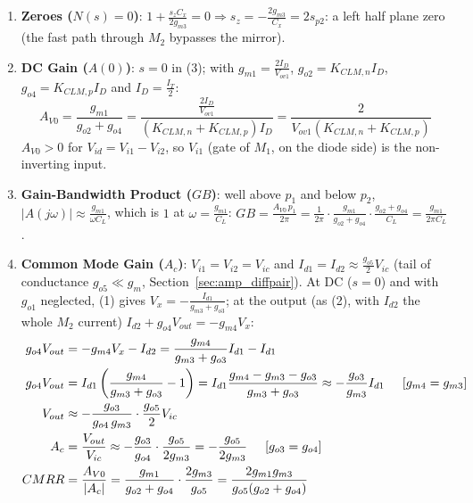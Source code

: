 \begin{enumerate}
  \item \textbf{Zeroes (\(N(s) = 0\))}:
    \(1 + \frac{s_z C_x}{2 g_{m3}} = 0 \Rightarrow s_z = -\frac{2 g_{m3}}{C_x} = 2 s_{p2}\): a left half plane zero (the
    fast path through \(M_2\) bypasses the mirror).
  \item \textbf{DC Gain (\(A(0)\))}: \(s = 0\) in (3); with \(g_{m1} = \frac{2 I_D}{V_{ov1}}\),
    \(g_{o2} = K_{CLM,n} I_D\), \(g_{o4} = K_{CLM,p} I_D\) and \(I_D = \frac{I_T}{2}\):
    \[
      A_{V0} = \frac{g_{m1}}{g_{o2} + g_{o4}} = \frac{\frac{2 I_D}{V_{ov1}}}{(K_{CLM,n} + K_{CLM,p}) I_D} = \frac{2}{V_{ov1}(K_{CLM,n} + K_{CLM,p})}
    \]
    \(A_{V0} > 0\) for \(V_{id} = V_{i1} - V_{i2}\), so \(V_{i1}\) (gate of
    \(M_1\), on the diode side) is the non-inverting input.
  \item \textbf{Gain-Bandwidth Product (\(GB\))}: well above \(p_1\) and below \(p_2\),
    \(|A(j\omega)| \approx \frac{g_{m1}}{\omega C_L}\), which is \(1\) at
    \(\omega = \frac{g_{m1}}{C_L}\):
    \(GB = \frac{A_{V0}\, p_1}{2\pi} = \frac{1}{2\pi} \cdot \frac{g_{m1}}{g_{o2} + g_{o4}} \cdot \frac{g_{o2} + g_{o4}}{C_L} = \frac{g_{m1}}{2\pi C_L}\).
  \item \textbf{Common Mode Gain (\(A_c\))}: \(V_{i1} = V_{i2} = V_{ic}\) and
    \(I_{d1} = I_{d2} \approx \frac{g_{o5}}{2} V_{ic}\) (tail of conductance
    \(g_{o5} \ll g_{m}\), Section~\ref{sec:amp_diffpair}). At DC (\(s = 0\)) and with
    \(g_{o1}\) neglected, (1) gives \(V_x = -\frac{I_{d1}}{g_{m3} + g_{o3}}\); at the
    output (as (2), with \(I_{d2}\) the whole \(M_2\) current)
    \(I_{d2} + g_{o4} V_{out} = -g_{m4} V_x\):
    \begin{align*}
      g_{o4} V_{out} &= -g_{m4} V_x - I_{d2} = \frac{g_{m4}}{g_{m3} + g_{o3}} I_{d1} - I_{d1} \\
      g_{o4} V_{out} &= I_{d1}\left(\frac{g_{m4}}{g_{m3} + g_{o3}} - 1\right) = I_{d1} \frac{g_{m4} - g_{m3} - g_{o3}}{g_{m3} + g_{o3}} \approx -\frac{g_{o3}}{g_{m3}} I_{d1} \hspace{0.5cm} [g_{m4} = g_{m3}] \\
      V_{out} &\approx -\frac{g_{o3}}{g_{o4}\, g_{m3}} \cdot \frac{g_{o5}}{2} V_{ic} \\
      A_c &= \frac{V_{out}}{V_{ic}} \approx -\frac{g_{o3}}{g_{o4}} \cdot \frac{g_{o5}}{2 g_{m3}} = -\frac{g_{o5}}{2 g_{m3}} \hspace{0.5cm} [g_{o3} = g_{o4}] \\
      CMRR &= \frac{A_{V0}}{|A_c|} = \frac{g_{m1}}{g_{o2} + g_{o4}} \cdot \frac{2 g_{m3}}{g_{o5}} = \frac{2 g_{m1} g_{m3}}{g_{o5}(g_{o2} + g_{o4})}

\end{align*}
\end{enumerate}
